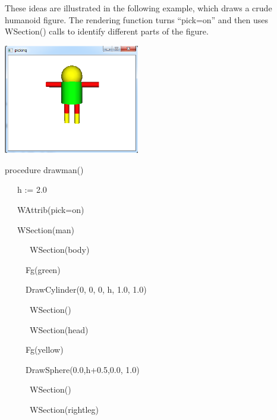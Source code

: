 \documentclass[letterpaper]{article}
\begin{document}
\bigskip

These ideas are illustrated in the following example, which draws
a crude humanoid figure. The rendering function turns
\textsf{{}``pick=on''} and then uses \textsf{WSection()} calls to
identify different parts of the figure.


\begin{center}
\includegraphics[width=2.3402in,height=1.8799in]{utr9/utr9-img034.png}
\end{center}

\bigskip


\bigskip

{\sffamily
procedure drawman()}

{\sffamily
\ \ \ h := 2.0}

{\sffamily
\ \ \ WAttrib({\textquotedbl}pick=on{\textquotedbl})}

{\sffamily
\ \ \ WSection({\textquotedbl}man{\textquotedbl})}

{\sffamily
\ \ \ \ \ \ WSection({\textquotedbl}body{\textquotedbl})}

{\sffamily
\ \ \ \ \  Fg({\textquotedbl}green{\textquotedbl})}

{\sffamily
\ \ \ \ \  DrawCylinder(0, 0, 0, h, 1.0, 1.0)}

{\sffamily
\ \ \ \ \ \ WSection()}

{\sffamily
\ \ \ \ \ \ WSection({\textquotedbl}head{\textquotedbl})}

{\sffamily
\ \ \ \ \  Fg({\textquotedbl}yellow{\textquotedbl})}

{\sffamily
\ \ \ \ \  DrawSphere(0.0,h+0.5,0.0, 1.0)}

{\sffamily
\ \ \ \ \ \ WSection()}

{\sffamily
\ \ \ \ \ \ WSection({\textquotedbl}rightleg{\textquotedbl})}
\end{document}
